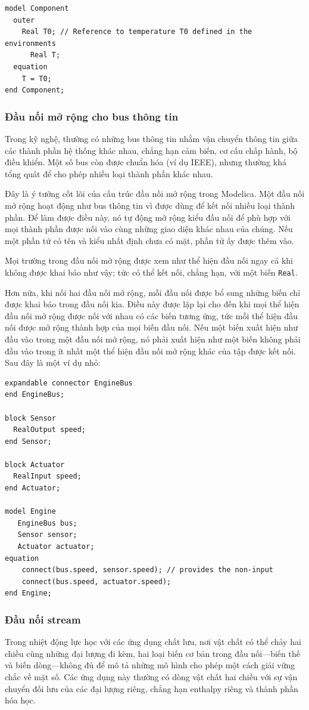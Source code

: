 \begin{verbatim}
model Component
  outer
    Real T0; // Reference to temperature T0 defined in the environments
      Real T;
  equation
    T = T0;
end Component;
\end{verbatim}

\subsubsection{Đầu nối mở rộng cho bus thông tin}
Trong kỹ nghệ, thường có những bus thông tin nhằm vận chuyển thông tin giữa các thành phần hệ thống khác nhau, chẳng hạn cảm biến, cơ cấu chấp hành, bộ điều khiển. Một số bus còn được chuẩn hóa (ví dụ IEEE), nhưng thường khá tổng quát để cho phép nhiều loại thành phần khác nhau.

Đây là ý tưởng cốt lõi của cấu trúc đầu nối mở rộng trong Modelica. Một đầu nối mở rộng hoạt động như bus thông tin vì được dùng để kết nối nhiều loại thành phần. Để làm được điều này, nó tự động mở rộng kiểu đầu nối để phù hợp với mọi thành phần được nối vào cùng những giao diện khác nhau của chúng. Nếu một phần tử có tên và kiểu nhất định chưa có mặt, phần tử ấy được thêm vào.

Mọi trường trong đầu nối mở rộng được xem như thể hiện đầu nối ngay cả khi không được khai báo như vậy; tức có thể kết nối, chẳng hạn, với một biến \texttt{Real}.

Hơn nữa, khi nối hai đầu nối mở rộng, mỗi đầu nối được bổ sung những biến chỉ được khai báo trong đầu nối kia. Điều này được lặp lại cho đến khi mọi thể hiện đầu nối mở rộng được nối với nhau có các biến tương ứng, tức mỗi thể hiện đầu nối được mở rộng thành hợp của mọi biến đầu nối. Nếu một biến xuất hiện như đầu vào trong một đầu nối mở rộng, nó phải xuất hiện như một biến không phải đầu vào trong ít nhất một thể hiện đầu nối mở rộng khác của tập được kết nối. Sau đây là một ví dụ nhỏ:
\begin{verbatim}
expandable connector EngineBus
end EngineBus;

block Sensor
  RealOutput speed;
end Sensor;

block Actuator
  RealInput speed;
end Actuator;

model Engine
   EngineBus bus;
   Sensor sensor;
   Actuator actuator;
equation
    connect(bus.speed, sensor.speed); // provides the non-input
    connect(bus.speed, actuator.speed);
end Engine;
\end{verbatim}

\subsubsection{Đầu nối stream}
Trong nhiệt động lực học với các ứng dụng chất lưu, nơi vật chất có thể chảy hai chiều cùng những đại lượng đi kèm, hai loại biến cơ bản trong đầu nối---biến thế và biến dòng---không đủ để mô tả những mô hình cho phép một cách giải vững chắc về mặt số. Các ứng dụng này thường có dòng vật chất hai chiều với sự vận chuyển đối lưu của các đại lượng riêng, chẳng hạn enthalpy riêng và thành phần hóa học.

